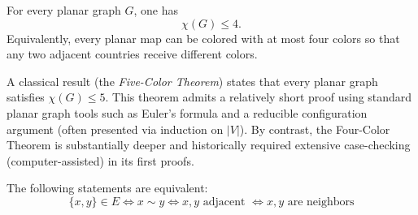 \documentclass[11pt, a4paper]{ctexrep}
\begin{document}
\begin{theorem}
    For every planar graph $G$, one has
    \[
        \chi(G)\le 4.
    \]
    Equivalently, every planar map can be colored with at most four colors so
    that any two adjacent countries receive different colors.
\end{theorem}

\begin{remark}
    A classical result (the \emph{Five-Color Theorem}) states that every planar
    graph satisfies $\chi(G)\le 5$. This theorem admits a relatively short proof
    using standard planar graph tools such as Euler's formula and a reducible
    configuration argument (often presented via induction on $|V|$).
    By contrast, the Four-Color Theorem is substantially deeper and historically
    required extensive case-checking (computer-assisted) in its first proofs.
\end{remark}

The following statements are equivalent:
\[ \{ x,y \} \in E  \Leftrightarrow x \sim y \Leftrightarrow x,y \text{ adjacent } \Leftrightarrow x,y \text{ are neighbors}\]
\end{document}
